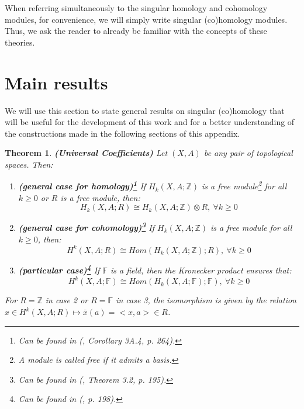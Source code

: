 \documentclass[12pt,oneside]{book}
\newtheorem{teo}    {Theorem}[chapter]
\newcommand{\Z}{\mathbb{Z}}
\newcommand{\F}{\mathbb{F}}
\newcommand{\tensor}{\otimes}
\begin{document}
    When referring simultaneously to the singular homology and cohomology modules, for convenience, we 
    will simply write singular (co)homology modules. Thus, we ask the 
    reader to already be familiar with the concepts of these theories.
    
    \section{Main results}\label{ap_principais_res}
    
    We will use this section to state general results on singular (co)homology that will be useful for 
    the development of this work and for a better understanding of the constructions made in the 
    following sections of this appendix.
    
    \begin{teo}{\bf (Universal Coefficients)}
        Let $(X,A)$ be any pair of topological spaces. Then:
        \begin{enumerate}
            \item \textbf{(general case for homology)\footnote{Can be found in (\cite{hatcher}, 
            Corollary 3A.4, p. 264).}} If $H_{k}(X,A;\Z)$ is a free 
            module\footnote{A module is called free if it admits a basis.} for 
            all $k\geq 0$ or $R$ is a free module, then:
            $$ H_{k}(X,A;R)\cong H_{k}(X,A;\Z)\tensor R, \ \forall k\geq 0 $$
            \item \textbf{(general case for cohomology)\footnote{Can be found in (\cite{hatcher}, 
            Theorem 3.2, p. 195).}} If $H_{k}(X,A;\Z)$ is a free module for all $k\geq 0$, then:
            $$ H^{k}(X,A;R)\cong Hom(H_{k}(X,A;\Z);R), \ \forall k\geq 0 $$
            \item \textbf{(particular case)\footnote{Can be found in (\cite{hatcher}, p. 198).}} 
            If $\mathbb{F}$ is a field, then the Kronecker product ensures that:
            $$ H^{k}(X,A;\F)\cong Hom(H_{k}(X,A;\F);\F), \ \forall k\geq 0 $$
        \end{enumerate}
        For $R=\Z$ in case 2 or $R=\F$ in case 3, the isomorphism is given by the relation 
        $x\in H^{k}(X,A;R)\mapsto\overline{x}(a)=<x,a>\in R$.
    \end{teo}
    
\end{document}
